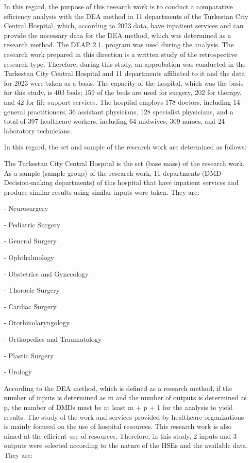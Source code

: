 In this regard, the purpose of this research work is to conduct a
comparative efficiency analysis with the DEA method in 11 departments of
the Turkestan City Central Hospital, which, according to 2023 data, have
inpatient services and can provide the necessary data for the DEA
method, which was determined as a research method. The DEAP 2.1. program
was used during the analysis. The research work prepared in this
direction is a written study of the retrospective research type.
Therefore, during this study, an approbation was conducted in the
Turkestan City Central Hospital and 11 departments affiliated to it and
the data for 2023 were taken as a basis. The capacity of the hospital,
which was the basis for this study, is 403 beds; 159 of the beds are
used for surgery, 202 for therapy, and 42 for life support services. The
hospital employs 178 doctors, including 14 general practitioners, 36
assistant physicians, 128 specialist physicians, and a total of 397
healthcare workers, including 64 midwives, 309 nurses, and 24 laboratory
technicians.

In this regard, the set and sample of the research work are determined
as follows:

The Turkestan City Central Hospital is the set (base mass) of the
research work. As a sample (sample group) of the research work, 11
departments (DMD-Decision-making departments) of this hospital that have
inpatient services and produce similar results using similar inputs were
taken. They are:

- Neurosurgery

- Pediatric Surgery

- General Surgery

- Ophthalmology

- Obstetrics and Gynecology

- Thoracic Surgery

- Cardiac Surgery

- Otorhinolaryngology

- Orthopedics and Traumatology

- Plastic Surgery

- Urology

According to the DEA method, which is defined as a research method, if
the number of inputs is determined as m and the number of outputs is
determined as p, the number of DMDs must be at least m + p + 1 for the
analysis to yield results. The study of the work and services provided
by healthcare organizations is mainly focused on the use of hospital
resources. This research work is also aimed at the efficient use of
resources. Therefore, in this study, 2 inputs and 3 outputs were
selected according to the nature of the HSEs and the available data.
They are:

